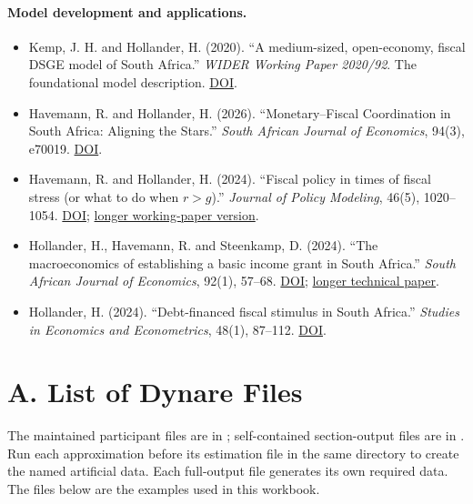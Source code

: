 \documentclass[12pt]{article}
\begin{document}
\paragraph{Model development and applications.}
\begin{itemize}
  \item Kemp, J. H. and Hollander, H. (2020). ``A medium-sized, open-economy, fiscal DSGE model of South Africa.'' \textit{WIDER Working Paper 2020/92}. The foundational model description. \href{https://doi.org/10.35188/UNU-WIDER/2020/849-8}{DOI}.
  \item Havemann, R. and Hollander, H. (2026). ``Monetary--Fiscal Coordination in South Africa: Aligning the Stars.'' \textit{South African Journal of Economics}, 94(3), e70019. \href{https://doi.org/10.1111/saje.70019}{DOI}.
  \item Havemann, R. and Hollander, H. (2024). ``Fiscal policy in times of fiscal stress (or what to do when $r>g$).'' \textit{Journal of Policy Modeling}, 46(5), 1020--1054. \href{https://doi.org/10.1016/j.jpolmod.2024.07.001}{DOI}; \href{https://doi.org/10.35188/UNU-WIDER/2022/183-9}{longer working-paper version}.
  \item Hollander, H., Havemann, R. and Steenkamp, D. (2024). ``The macroeconomics of establishing a basic income grant in South Africa.'' \textit{South African Journal of Economics}, 92(1), 57--68. \href{https://doi.org/10.1111/saje.12363}{DOI}; \href{https://mpra.ub.uni-muenchen.de/id/eprint/114614}{longer technical paper}.
  \item Hollander, H. (2024). ``Debt-financed fiscal stimulus in South Africa.'' \textit{Studies in Economics and Econometrics}, 48(1), 87--112. \href{https://doi.org/10.1080/03796205.2024.2321628}{DOI}.
\end{itemize}

\appendix

\section*{A. List of Dynare Files}
{}
The maintained participant files are in ; self-contained section-output files are in . Run each approximation before its estimation file in the same directory to create the named artificial data. Each full-output file generates its own required data. The files below are the examples used in this workbook.
\end{document}
